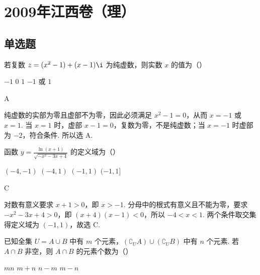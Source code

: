 
\chapter{2009年江西卷（理）}

\section{单选题}

\begin{problem}
若复数 \(z = (x^2 - 1) + (x - 1)\i\) 为纯虚数，则实数 \(x\) 的值为（\quad）

\choices
    {\(-1\)}
    {\(0\)}
    {\(1\)}
    {\(-1\) 或 \(1\)}
\end{problem}

\begin{answer}
A
\end{answer}

\begin{solution}
纯虚数的实部为零且虚部不为零，因此必须满足 \(x^{2}-1=0\)，从而 \(x=-1\) 或 \(x=1\). 当 \(x=1\) 时，虚部 \(x-1=0\)，复数为零，不是纯虚数；当 \(x=-1\) 时虚部为 \(-2\)，符合条件. 所以选 A.
\end{solution}

\begin{problem}
函数 \( y = \frac{\ln(x + 1)}{\sqrt{-x^2 - 3x + 4}} \) 的定义域为（\quad）

\choices
    {\((-4, - 1)\)}
    {\((-4, 1)\)}
    {\((-1, 1)\)}
    {\((-1, 1]\)}
\end{problem}

\begin{answer}
C
\end{answer}

\begin{solution}
对数有意义要求 \(x+1>0\)，即 \(x>-1\). 分母中的根式有意义且不能为零，要求 \(-x^{2}-3x+4>0\)，即 \((x+4)(x-1)<0\)，所以 \(-4<x<1\). 两个条件取交集得定义域为 \((-1,1)\)，故选 C.
\end{solution}

\begin{problem}
已知全集 \(U = A \cup B\) 中有 \(m\) 个元素，\((\complement_U A) \cup (\complement_U B)\) 中有 \(n\) 个元素. 若 \(A \cap B\) 非空，则 \(A \cap B\) 的元素个数为（\quad）

\choices
    {\(mn\)}
    {\(m + n\)}
    {\(n - m\)}
    {\(m - n\)}
\end{problem}

